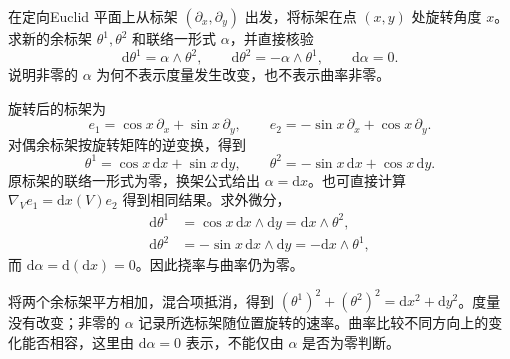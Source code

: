 \begin{exercise}\label{g1:ex:rotating-plane-frame-gauge}
	在定向Euclid 平面上从标架 \((\partial_x,\partial_y)\) 出发，将标架在点 \((x,y)\) 处旋转角度 \(x\)。求新的余标架 \(\theta^1,\theta^2\) 和联络一形式 \(\alpha\)，并直接核验
	\[
		\mathrm{d}\theta^1=\alpha\wedge\theta^2,\qquad
		\mathrm{d}\theta^2=-\alpha\wedge\theta^1,\qquad
		\mathrm{d}\alpha=0.
	\]
	说明非零的 \(\alpha\) 为何不表示度量发生改变，也不表示曲率非零。
\end{exercise}
\begin{solution}
	旋转后的标架为
	\[
		e_1=\cos x\,\partial_x+\sin x\,\partial_y,\qquad
		e_2=-\sin x\,\partial_x+\cos x\,\partial_y.
	\]
	对偶余标架按旋转矩阵的逆变换，得到
	\[
		\theta^1=\cos x\,\mathrm{d}x+\sin x\,\mathrm{d}y,\qquad
		\theta^2=-\sin x\,\mathrm{d}x+\cos x\,\mathrm{d}y.
	\]
	原标架的联络一形式为零，换架公式给出 \(\alpha=\mathrm{d}x\)。也可直接计算 \(\nabla_Ve_1=\mathrm{d}x(V)e_2\) 得到相同结果。求外微分，
	\[
		\begin{aligned}
			\mathrm{d}\theta^1&=\cos x\,\mathrm{d}x\wedge\mathrm{d}y
			=\mathrm{d}x\wedge\theta^2,\\
			\mathrm{d}\theta^2&=-\sin x\,\mathrm{d}x\wedge\mathrm{d}y
			=-\mathrm{d}x\wedge\theta^1,
		\end{aligned}
	\]
	而 \(\mathrm{d}\alpha=\mathrm{d}(\mathrm{d}x)=0\)。因此挠率与曲率仍为零。

	将两个余标架平方相加，混合项抵消，得到 \((\theta^1)^2+(\theta^2)^2=\mathrm{d}x^2+\mathrm{d}y^2\)。度量没有改变；非零的 \(\alpha\) 记录所选标架随位置旋转的速率。曲率比较不同方向上的变化能否相容，这里由 \(\mathrm{d}\alpha=0\) 表示，不能仅由 \(\alpha\) 是否为零判断。
\end{solution}

